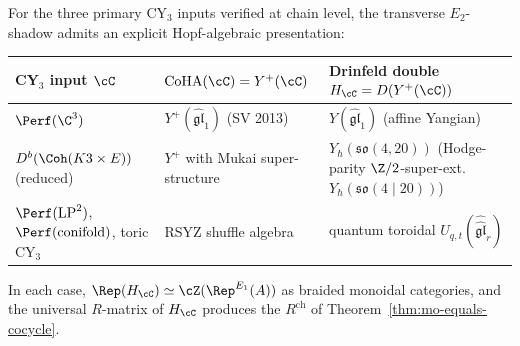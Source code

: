 \begin{theorem}
\label{thm:transverse-hopf-presentation}
For the three primary CY$_3$ inputs verified at chain level, the
transverse $E_2$-shadow admits an explicit Hopf-algebraic presentation:

\begin{center}
\renewcommand{\arraystretch}{1.3}
\small
\begin{tabular}{lll}
 \toprule
 \textbf{CY$_3$ input } $\cC$ & $\mathrm{CoHA}(\cC) = Y^+(\cC)$ &
 \textbf{Drinfeld double } $H_\cC = D(Y^+(\cC))$ \\
 \midrule
 $\Perf(\C^3)$ & $Y^+(\widehat{\mathfrak{gl}}_1)$ (SV 2013) &
 $Y(\widehat{\mathfrak{gl}}_1)$ (affine Yangian) \\
 $D^b(\Coh(K3 \times E))$ (reduced) &
 $Y^+$ with Mukai super-structure &
 $Y_\hbar(\mathfrak{so}(4, 20))$ (Hodge-parity $\Z/2$-super-ext.\ $Y_\hbar(\mathfrak{so}(4 \mid 20))$) \\
 $\Perf(\mathrm{LP}^2)$, $\Perf(\text{conifold})$, toric CY$_3$ &
 RSYZ shuffle algebra &
 quantum toroidal $U_{q, t}(\widehat{\widehat{\mathfrak{gl}}}_r)$ \\
 \bottomrule
\end{tabular}
\end{center}

In each case, $\Rep(H_\cC) \simeq \cZ(\Rep^{E_1}(A))$ as braided
monoidal categories, and the universal $R$-matrix of $H_\cC$ produces
the $R^{\mathrm{ch}}$ of Theorem~\ref{thm:mo-equals-cocycle}.
\end{theorem}

